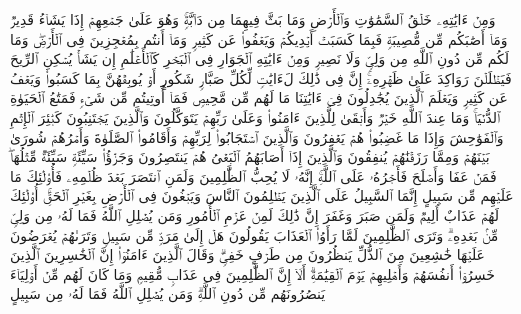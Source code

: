 \startbuffer[\q:42:29]
وَمِنۡ ءَایَٰتِهِۦ خَلۡقُ ٱلسَّمَٰوَٰتِ وَٱلۡأَرۡضِ وَمَا بَثَّ فِیهِمَا مِن دَاۤبَّةࣲۚ وَهُوَ عَلَىٰ جَمۡعِهِمۡ إِذَا یَشَاۤءُ قَدِیرࣱ%
\stopbuffer%
\startbuffer[\q:42:30]
وَمَاۤ أَصَٰبَكُم مِّن مُّصِیبَةࣲ فَبِمَا كَسَبَتۡ أَیۡدِیكُمۡ وَیَعۡفُوا۟ عَن كَثِیرࣲ%
\stopbuffer%
\startbuffer[\q:42:31]
وَمَاۤ أَنتُم بِمُعۡجِزِینَ فِی ٱلۡأَرۡضِۖ وَمَا لَكُم مِّن دُونِ ٱللَّهِ مِن وَلِیࣲّ وَلَا نَصِیرࣲ%
\stopbuffer%
\startbuffer[\q:42:32]
وَمِنۡ ءَایَٰتِهِ ٱلۡجَوَارِ فِی ٱلۡبَحۡرِ كَٱلۡأَعۡلَٰمِ%
\stopbuffer%
\startbuffer[\q:42:33]
إِن یَشَأۡ یُسۡكِنِ ٱلرِّیحَ فَیَظۡلَلۡنَ رَوَاكِدَ عَلَىٰ ظَهۡرِهِۦۤۚ إِنَّ فِی ذَٰلِكَ لَءَایَٰتࣲ لِّكُلِّ صَبَّارࣲ شَكُورٍ%
\stopbuffer%
\startbuffer[\q:42:34]
أَوۡ یُوبِقۡهُنَّ بِمَا كَسَبُوا۟ وَیَعۡفُ عَن كَثِیرࣲ%
\stopbuffer%
\startbuffer[\q:42:35]
وَیَعۡلَمَ ٱلَّذِینَ یُجَٰدِلُونَ فِیۤ ءَایَٰتِنَا مَا لَهُم مِّن مَّحِیصࣲ%
\stopbuffer%
\startbuffer[\q:42:36]
فَمَاۤ أُوتِیتُم مِّن شَیۡءࣲ فَمَتَٰعُ ٱلۡحَیَوٰةِ ٱلدُّنۡیَاۚ وَمَا عِندَ ٱللَّهِ خَیۡرࣱ وَأَبۡقَىٰ لِلَّذِینَ ءَامَنُوا۟ وَعَلَىٰ رَبِّهِمۡ یَتَوَكَّلُونَ%
\stopbuffer%
\startbuffer[\q:42:37]
وَٱلَّذِینَ یَجۡتَنِبُونَ كَبَٰۤئِرَ ٱلۡإِثۡمِ وَٱلۡفَوَٰحِشَ وَإِذَا مَا غَضِبُوا۟ هُمۡ یَغۡفِرُونَ%
\stopbuffer%
\startbuffer[\q:42:38]
وَٱلَّذِینَ ٱسۡتَجَابُوا۟ لِرَبِّهِمۡ وَأَقَامُوا۟ ٱلصَّلَوٰةَ وَأَمۡرُهُمۡ شُورَىٰ بَیۡنَهُمۡ وَمِمَّا رَزَقۡنَٰهُمۡ یُنفِقُونَ%
\stopbuffer%
\startbuffer[\q:42:39]
وَٱلَّذِینَ إِذَاۤ أَصَابَهُمُ ٱلۡبَغۡیُ هُمۡ یَنتَصِرُونَ%
\stopbuffer%
\startbuffer[\q:42:40]
وَجَزَٰۤؤُا۟ سَیِّئَةࣲ سَیِّئَةࣱ مِّثۡلُهَاۖ فَمَنۡ عَفَا وَأَصۡلَحَ فَأَجۡرُهُۥ عَلَى ٱللَّهِۚ إِنَّهُۥ لَا یُحِبُّ ٱلظَّٰلِمِینَ%
\stopbuffer%
\startbuffer[\q:42:41]
وَلَمَنِ ٱنتَصَرَ بَعۡدَ ظُلۡمِهِۦ فَأُو۟لَٰۤئِكَ مَا عَلَیۡهِم مِّن سَبِیلٍ%
\stopbuffer%
\startbuffer[\q:42:42]
إِنَّمَا ٱلسَّبِیلُ عَلَى ٱلَّذِینَ یَظۡلِمُونَ ٱلنَّاسَ وَیَبۡغُونَ فِی ٱلۡأَرۡضِ بِغَیۡرِ ٱلۡحَقِّۚ أُو۟لَٰۤئِكَ لَهُمۡ عَذَابٌ أَلِیمࣱ%
\stopbuffer%
\startbuffer[\q:42:43]
وَلَمَن صَبَرَ وَغَفَرَ إِنَّ ذَٰلِكَ لَمِنۡ عَزۡمِ ٱلۡأُمُورِ%
\stopbuffer%
\startbuffer[\q:42:44]
وَمَن یُضۡلِلِ ٱللَّهُ فَمَا لَهُۥ مِن وَلِیࣲّ مِّنۢ بَعۡدِهِۦۗ وَتَرَى ٱلظَّٰلِمِینَ لَمَّا رَأَوُا۟ ٱلۡعَذَابَ یَقُولُونَ هَلۡ إِلَىٰ مَرَدࣲّ مِّن سَبِیلࣲ%
\stopbuffer%
\startbuffer[\q:42:45]
وَتَرَىٰهُمۡ یُعۡرَضُونَ عَلَیۡهَا خَٰشِعِینَ مِنَ ٱلذُّلِّ یَنظُرُونَ مِن طَرۡفٍ خَفِیࣲّۗ وَقَالَ ٱلَّذِینَ ءَامَنُوۤا۟ إِنَّ ٱلۡخَٰسِرِینَ ٱلَّذِینَ خَسِرُوۤا۟ أَنفُسَهُمۡ وَأَهۡلِیهِمۡ یَوۡمَ ٱلۡقِیَٰمَةِۗ أَلَاۤ إِنَّ ٱلظَّٰلِمِینَ فِی عَذَابࣲ مُّقِیمࣲ%
\stopbuffer%
\startbuffer[\q:42:46]
وَمَا كَانَ لَهُم مِّنۡ أَوۡلِیَاۤءَ یَنصُرُونَهُم مِّن دُونِ ٱللَّهِۗ وَمَن یُضۡلِلِ ٱللَّهُ فَمَا لَهُۥ مِن سَبِیلٍ%
